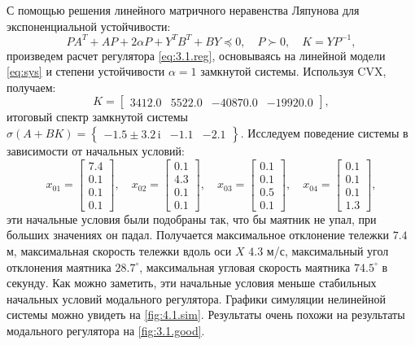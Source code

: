 С помощью решения линейного матричного неравенства Ляпунова 
для экспоненциальной устойчивости:
\begin{equation*}
    PA^T+AP+2\alpha P+Y^TB^T+BY\preccurlyeq 0,\quad P\succ0,\quad K=YP^{-1},
\end{equation*}
произведем расчет регулятора \eqref{eq:3.1.reg}, основываясь на 
линейной модели \eqref{eq:sys} и степени устойчивости $\alpha=1$ замкнутой системы. 
Используя CVX, получаем:
\begin{equation*}
    K=\begin{bmatrix}
3412.0 & 5522.0 & -40870.0 & -19920.0
    \end{bmatrix},
\end{equation*}
итоговый спектр замкнутой системы $\sigma(A+BK)=\left\{\begin{array}{cccc}
-1.5\pm3.2\,\mathrm{i}&
-1.1&
-2.1
\end{array}\right\}.$
Исследуем поведение системы в зависимости от начальных условий:
\begin{equation*}
    x_{01}=\begin{bmatrix}
        7.4\\
        0.1\\
        0.1\\
        0.1
    \end{bmatrix},\quad
    x_{02}=\begin{bmatrix}
        0.1\\
         4.3\\
         0.1\\
         0.1
    \end{bmatrix},\quad
    x_{03}=\begin{bmatrix}
        0.1\\
         0.1\\
         0.5\\
         0.1
    \end{bmatrix},\quad
    x_{04}=\begin{bmatrix}
        0.1\\
        0.1\\
        0.1\\
        1.3
    \end{bmatrix},
\end{equation*}
эти начальные условия были подобраны так, что бы маятник не упал, при больших 
значениях он падал. Получается максимальное отклонение тележки $7.4$ м,
максимальная скорость тележки вдоль оси $X$ $4.3$ м/с, максимальный угол 
отклонения маятника $28.7^\circ$, максимальная угловая скорость
маятника $74.5^\circ$ в секунду.
Как можно заметить, эти начальные условия меньше стабильных начальных условий 
модального регулятора. Графики симуляции нелинейной системы 
можно увидеть на \autoref{fig:4.1.sim}. Результаты очень похожи на результаты
модального регулятора на \autoref{fig:3.1.good}.

